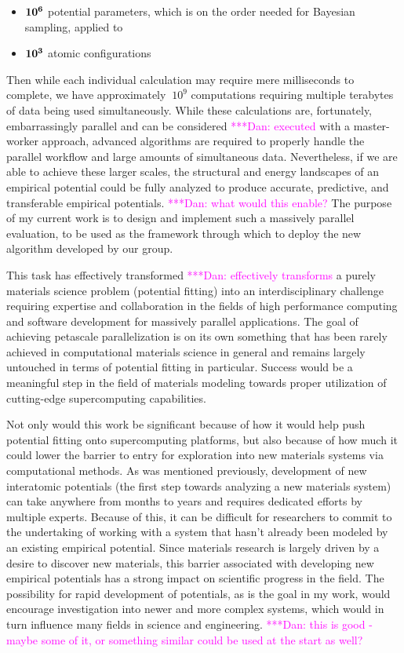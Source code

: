 \documentclass{article}
\newcommand{\katznote}[1]{ {\textcolor{magenta}    { ***Dan:      #1 }}}
\begin{document}
\begin{itemize}
    \item $\bf{10^6}$ potential parameters, which is on the order needed for Bayesian sampling, applied to
    \item $\bf{10^3}$ atomic configurations
\end{itemize}

\noindent Then while each individual calculation may require mere milliseconds to complete, we have approximately $~10^9$ computations requiring multiple terabytes of data being used simultaneously. While these calculations are, fortunately, embarrassingly parallel and can be considered \katznote{executed} with a master-worker approach, advanced algorithms are required to properly handle the parallel workflow and large amounts of simultaneous data. Nevertheless, if we are able to achieve these larger scales, the structural and energy landscapes of an empirical potential could be fully analyzed to produce accurate, predictive, and transferable empirical potentials. \katznote{what would this enable?} The purpose of my current work is to design and implement such a massively parallel evaluation, to be used as the framework through which to deploy the new algorithm developed by our group.

\bigskip

This task has effectively transformed \katznote{effectively transforms} a purely materials science problem (potential fitting) into an interdisciplinary challenge requiring expertise and collaboration in the fields of high performance computing and software development for massively parallel applications. The goal of achieving petascale parallelization is on its own something that has been rarely achieved in computational materials science in general and remains largely untouched in terms of potential fitting in particular. Success would be a meaningful step in the field of materials modeling towards proper utilization of cutting-edge supercomputing capabilities.

Not only would this work be significant because of how it would help push potential fitting onto supercomputing platforms, but also because of how much it could lower the barrier to entry for exploration into new materials systems via computational methods. As was mentioned previously, development of new interatomic potentials (the first step towards analyzing a new materials system) can take anywhere from months to years and requires dedicated efforts by multiple experts. Because of this, it can be difficult for researchers to commit to the undertaking of working with a system that hasn't already been modeled by an existing empirical potential. Since materials research is largely driven by a desire to discover new materials, this barrier associated with developing new empirical potentials has a strong impact on scientific progress in the field. The possibility for rapid development of potentials, as is the goal in my work, would encourage investigation into newer and more complex systems, which would in turn influence many fields in science and engineering. \katznote{this is good - maybe some of it, or something similar could be used at the start as well?}
\end{document}
